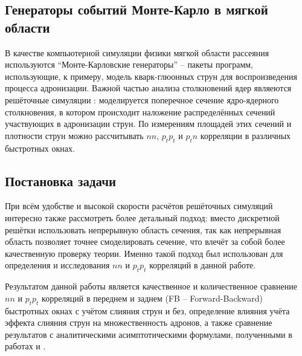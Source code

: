 \subsection{Генераторы событий Монте-Карло в мягкой области}
В качестве компьютерной симуляции физики мягкой области рассеяния используются ``Монте-Карловские генераторы'' \cite{MonteCarlo1,MonteCarlo2} -- пакеты программ, использующие, к примеру, модель кварк-глюонных струн для воспроизведения процесса адронизации. 
Важной частью анализа столкновений ядер являеются решёточные симуляции \cite{TransLattice1,TransLattice2}: моделируется поперечное сечение ядро-ядерного столкновения, в котором происходит наложение распределённых сечений участвующих в адронизации струн. 
По измерениям площадей этих сечений и плотности струн можно рассчитывать $nn$, $p_t p_t$ и $p_t n$ корреляции в различных быстротных окнах.
\subsection{Постановка задачи}
При всём удобстве  и высокой скорости расчётов решёточных симуляций интересно также рассмотреть более детальный подход: вместо дискретной решётки использовать непрерывную область сечения, так как непрерывная область позволяет точнее смоделировать сечение, что влечёт за собой более качественную проверку теории. 
Именно такой подход был использован для определения и исследования $nn$ и $p_tp_t$ корреляций в данной работе. 

Результатом данной работы является качественное и количественное сравнение $nn$ и $p_tp_t$ корреляций в переднем и заднем (FB -- Forward-Backward) быстротных окнах с учётом слияния струн и без, определение влияния учёта эффекта слияния струн на множественность адронов, а также сравнение результатов с аналитическими асимптотическими формулами, полученными в работах \cite{bStatement} и \cite{dissert}.

